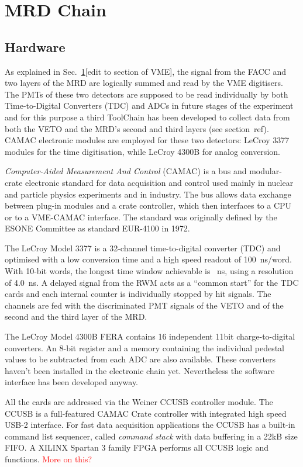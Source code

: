 \section{MRD Chain}
\label{sec:3.2}

\subsection{Hardware}

As explained in Sec.~\ref{sec:3.2}[edit to section of VME], the signal from the FACC %
and two layers of the MRD are logically summed and read by the VME digitisers.
The PMTs of these two detectors are supposed to be read individually by both Time-to-Digital %
Converters (TDC) and ADCs in future stages of the experiment and for this purpose %
a third ToolChain has been developed to collect data from both the VETO and %
the MRD's second and third layers (see section~ref).
CAMAC electronic modules are employed for these two detectors: LeCroy 3377 modules for the time %
digitisation, while LeCroy 4300B for analog conversion.

\emph{Computer-Aided Measurement And Control} (CAMAC) is a bus and modular-crate electronic %
standard for data acquisition and control used mainly in nuclear and particle physics experiments %
and in industry.
The bus allows data exchange between plug-in modules and a crate controller, %
which then interfaces to a CPU or to a VME-CAMAC interface.
The standard was originally defined by the ESONE Committee as standard EUR-4100 in 1972.

The LeCroy Model 3377 is a 32-channel time-to-digital converter (TDC) and %
optimised with a low conversion time and a high speed readout of 100~ns/word.
With 10-bit words, the longest time window achievable is ~ns, using a resolution %
of 4.0~ns.
A delayed signal from the RWM acts as a ``common start'' for the TDC cards and %
each internal counter is individually stopped by hit signals.
The channels are fed with the discriminated PMT signals of the VETO and of the second %
and the third layer of the MRD.

The LeCroy Model 4300B FERA contains 16 independent 11bit charge-to-digital converters.
An 8-bit register and a memory containing the individual pedestal values to be subtracted from %
each ADC are also available.
These converters haven't been installed in the electronic chain yet.
Nevertheless the software interface has been developed anyway.

All the cards are addressed via the Weiner CCUSB controller module. 
The CCUSB is a full-featured CAMAC Crate controller with integrated high speed USB-2 %
interface.
For fast data acquisition applications the CCUSB has a built-in command list sequencer, called %
\emph{command stack} with data buffering in a 22kB size FIFO.
A XILINX Spartan 3 family FPGA performs all CCUSB logic and functions. 
\textcolor{red}{More on this?}


